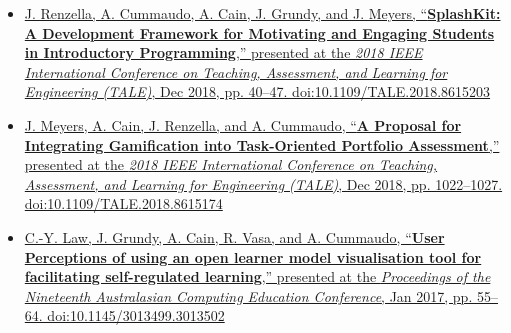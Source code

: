 {\begin{itemize}
  \item \href{http://doi.org/10.1109/TALE.2018.8615203}{J. Renzella, A. Cummaudo, A. Cain, J. Grundy, and J. Meyers, ``\textbf{SplashKit: A Development Framework for Motivating and Engaging Students in Introductory Programming},'' presented at the \textit{2018 IEEE International Conference on Teaching, Assessment, and Learning for Engineering (TALE)}, Dec 2018, pp. 40--47. doi:10.1109/TALE.2018.8615203}\\
  \item \href{http://doi.org/10.1109/TALE.2018.8615174}{J. Meyers, A. Cain, J. Renzella, and A. Cummaudo, ``\textbf{A Proposal for Integrating Gamification into Task-Oriented Portfolio Assessment},'' presented at the \textit{2018 IEEE International Conference on Teaching, Assessment, and Learning for Engineering (TALE)}, Dec 2018, pp. 1022--1027. doi:10.1109/TALE.2018.8615174}\\
  \item \href{http://doi.org/10.1145/3013499.3013502}{C.-Y. Law, J. Grundy, A. Cain, R. Vasa, and A. Cummaudo, ``\textbf{User Perceptions of using an open learner model visualisation tool for facilitating self-regulated learning},'' presented at the \textit{Proceedings of the Nineteenth Australasian Computing Education Conference}, Jan 2017, pp. 55--64. doi:10.1145/3013499.3013502}
\end{itemize}
}

%
%
%  
